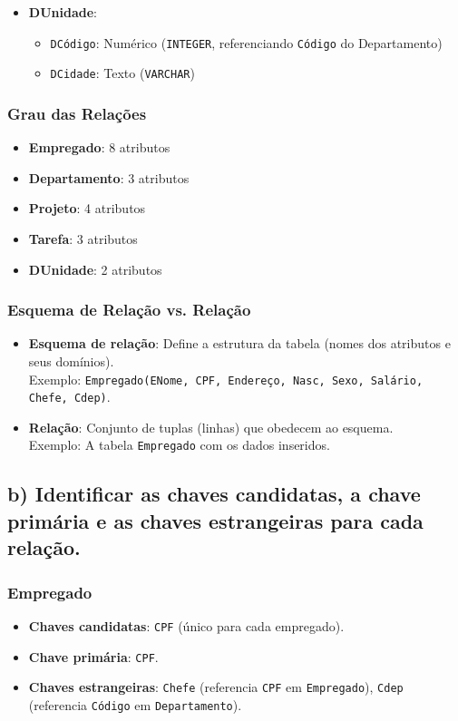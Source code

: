 \documentclass[a4paper,12pt]{article}
\begin{document}
\begin{itemize}
    \item \textbf{DUnidade}:
    \begin{itemize}
        \item \texttt{DCódigo}: Numérico (\texttt{INTEGER}, referenciando \texttt{Código} do Departamento)
        \item \texttt{DCidade}: Texto (\texttt{VARCHAR})
    \end{itemize}
\end{itemize}

\vspace{0.5cm}
\subsubsection*{Grau das Relações}
\begin{itemize}
    \item \textbf{Empregado}: 8 atributos
    \item \textbf{Departamento}: 3 atributos
    \item \textbf{Projeto}: 4 atributos
    \item \textbf{Tarefa}: 3 atributos
    \item \textbf{DUnidade}: 2 atributos
\end{itemize}

\subsubsection*{Esquema de Relação vs. Relação}
\begin{itemize}
    \item \textbf{Esquema de relação}: Define a estrutura da tabela (nomes dos atributos e seus domínios).\\
    Exemplo: \texttt{Empregado(ENome, CPF, Endereço, Nasc, Sexo, Salário, Chefe, Cdep)}.
    \item \textbf{Relação}: Conjunto de tuplas (linhas) que obedecem ao esquema. \\
    Exemplo: A tabela \texttt{Empregado} com os dados inseridos.
\end{itemize}

\subsection*{b) Identificar as chaves candidatas, a chave primária e as chaves estrangeiras para cada relação.}

\subsubsection*{Empregado}
\begin{itemize}
    \item \textbf{Chaves candidatas}: \texttt{CPF} (único para cada empregado).
    \item \textbf{Chave primária}: \texttt{CPF}.
    \item \textbf{Chaves estrangeiras}: \texttt{Chefe} (referencia \texttt{CPF} em \texttt{Empregado}), \texttt{Cdep} (referencia \texttt{Código} em \texttt{Departamento}).
\end{itemize}
\end{document}
